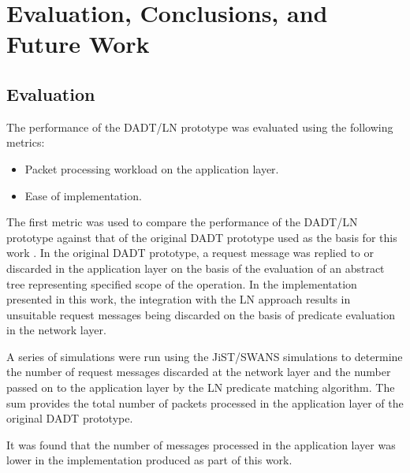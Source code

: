 \chapter{Evaluation, Conclusions, and Future Work} \label{chap: Evaluation}
 \section{Evaluation}

The performance of the DADT/LN prototype was evaluated using the following
metrics: 
\begin{itemize}
  \item Packet processing workload on the application layer.
  \item Ease of implementation. 
\end{itemize}

The first metric was used to compare the performance of the DADT/LN prototype
against that of the original DADT prototype used as the basis for this work
\cite{migliavacca_DADT:2006}. In the original DADT prototype, a request message
was replied to or discarded in the application layer on the basis of the
evaluation of an abstract tree representing specified scope of the operation.
In the implementation presented in this work, the integration with the LN approach results in unsuitable request messages being discarded on
the basis of predicate evaluation in the network layer. 

A series of simulations were run using the JiST/SWANS simulations to determine
the number of request messages discarded at the network layer and the number
passed on to the application layer by the LN predicate matching algorithm. The
sum provides the total number of packets processed in the application layer of
the original DADT prototype.

It was found that the number of messages processed in the application layer was
lower in the implementation produced as part of this work.


%


